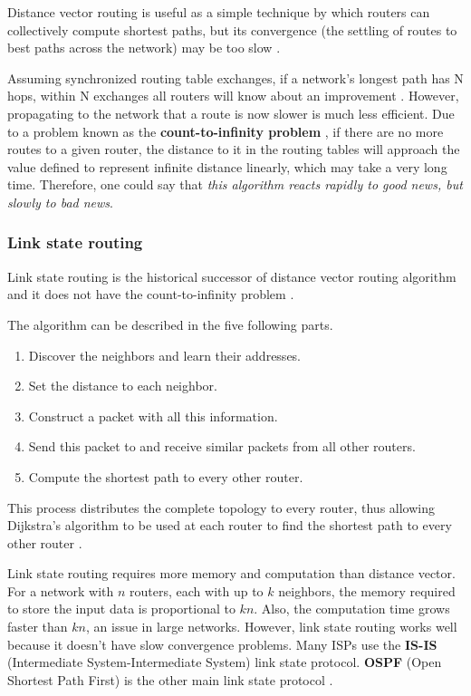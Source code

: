 \documentclass[12pt, oneside]{book}
\begin{document}
Distance vector routing is useful as a simple technique by which routers can collectively compute shortest paths, but its convergence (the settling of routes to best paths across the network) may be too slow \cite[p.~372]{computer-networks-tanenbaum-2012}.

Assuming synchronized routing table exchanges, if a network's longest path has N hops, within N exchanges all routers will know about an improvement \cite[p.~372]{computer-networks-tanenbaum-2012}. However, propagating to the network that a route is now slower is much less efficient. Due to a problem known as the \textbf{count-to-infinity problem} \cite[p.~373]{computer-networks-tanenbaum-2012}, if there are no more routes to a given router, the distance to it in the routing tables will approach the value defined to represent infinite distance linearly, which may take a very long time. Therefore, one could say that \textit{this algorithm reacts rapidly to good news, but slowly to bad news}.

\subsubsection{Link state routing}

Link state routing is the historical successor of distance vector routing algorithm and it does not have the count-to-infinity problem \cite[p.~373]{computer-networks-tanenbaum-2012}.

The algorithm can be described in the five following parts.

\begin{enumerate}
    \item Discover the neighbors and learn their addresses.
    \item Set the distance to each neighbor.
    \item Construct a packet with all this information.
    \item Send this packet to and receive similar packets from all other routers.
    \item Compute the shortest path to every other router.
\end{enumerate}

This process distributes the complete topology to every router, thus allowing Dijkstra's algorithm to be used at each router to find the shortest path to every other router \cite[p.~374]{computer-networks-tanenbaum-2012}.

Link state routing requires more memory and computation than distance vector.
For a network with \(n\) routers, each with up to \(k\) neighbors, the memory required to store the input data is proportional to \(kn\). Also, the computation time grows faster than \(kn\), an issue in large networks.
However, link state routing works well because it doesn't have slow convergence problems.
Many ISPs use the \textbf{IS-IS} (Intermediate System-Intermediate System) link state protocol.
\textbf{OSPF} (Open Shortest Path First) is the other main link state protocol \cite[p.~378]{computer-networks-tanenbaum-2012}.
\end{document}
